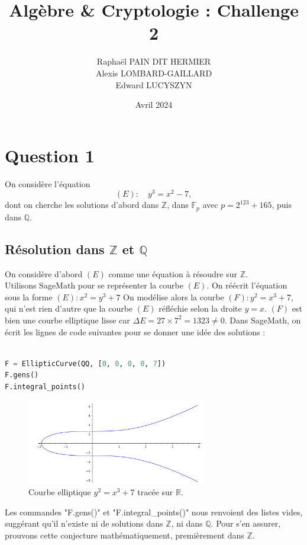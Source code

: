 \documentclass{article}
\title{Algèbre \& Cryptologie : Challenge 2}
\author{Raphaël PAIN DIT HERMIER\\
Alexis LOMBARD-GAILLARD\\
Edward LUCYSZYN}
\date{Avril 2024}
\newcommand{\bZ}{\mathbb{Z}}
\newcommand{\bR}{\mathbb{R}}
\newcommand{\bF}{\mathbb{F}}
\newcommand{\bQ}{\mathbb{Q}}
\begin{document}


\tableofcontents

\newpage
\section{Question 1}

On considère l'équation
\[(E): \quad y^3 = x^2-7,\]
dont on cherche les solutions d'abord dans $\bZ$, dans $\bF_p$ avec $p = 2^{123}+165$, puis dans $\bQ$.

\subsection{Résolution dans $\bZ$ et $\bQ$}

On considère d'abord $(E)$ comme une équation à résoudre sur $\bZ$.\\

Utilisons SageMath pour se représenter la courbe $(E)$. On réécrit l'équation sous la forme $(E): x^2 = y^3+7$ On modélise alors la courbe $(F): y^2 = x^3+7$, qui n'est rien d'autre que la courbe $(E)$ réfléchie selon la droite $y=x$. $(F)$ est bien une courbe elliptique lisse car $\Delta E = 27\times 7^2 = 1323 \neq 0$. Dans SageMath, on écrit les lignes de code suivantes pour se donner une idée des solutions :

\begin{lstlisting}[language = Python]

F = EllipticCurve(QQ, [0, 0, 0, 0, 7])
F.gens()
F.integral_points()

\end{lstlisting}

\begin{figure}[h]
\centering
\includegraphics[width=0.7\textwidth]{Capture d'écran 2024-05-22 151712.png}
\caption{Courbe elliptique $y^2 = x^3+7$ tracée sur $\bR$.}
\label{fig:exemple}
\end{figure}

Les commandes "F.gens()" et "F.integral\_points()" nous renvoient des listes vides, suggérant qu'il n'existe ni de solutions dans $\bZ$, ni dans $\bQ$. Pour s'en assurer, prouvons cette conjecture mathématiquement, premièrement dans $\bZ$.\\
\end{document}
